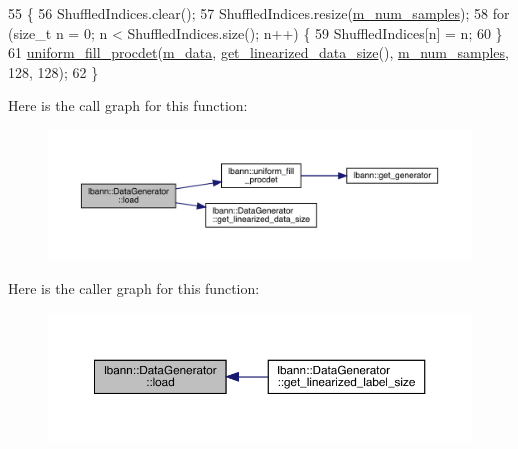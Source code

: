 \begin{DoxyCode}
55                               \{
56   ShuffledIndices.clear();
57   ShuffledIndices.resize(\hyperlink{classlbann_1_1DataGenerator_a679fdbd459ecefa053b64f78a166c020}{m\_num\_samples});
58   \textcolor{keywordflow}{for} (\textcolor{keywordtype}{size\_t} n = 0; n < ShuffledIndices.size(); n++) \{
59     ShuffledIndices[n] = n;
60   \}
61   \hyperlink{namespacelbann_a93fc1b42be6ab461e803cb48d58c4d81}{uniform\_fill\_procdet}(\hyperlink{classlbann_1_1DataGenerator_a6e14ec2aa2b20ca3dbb72eddd1c5fad8}{m\_data}, 
      \hyperlink{classlbann_1_1DataGenerator_ad24923ec94dc5b6575b50b74adbefc28}{get\_linearized\_data\_size}(), \hyperlink{classlbann_1_1DataGenerator_a679fdbd459ecefa053b64f78a166c020}{m\_num\_samples}, 128, 128);
62 \}
\end{DoxyCode}
Here is the call graph for this function\+:\nopagebreak
\begin{figure}[H]
\begin{center}
\leavevmode
\includegraphics[width=350pt]{classlbann_1_1DataGenerator_a8248cc6ea186c23147887ca83b1c4bd7_cgraph}
\end{center}
\end{figure}
Here is the caller graph for this function\+:\nopagebreak
\begin{figure}[H]
\begin{center}
\leavevmode
\includegraphics[width=350pt]{classlbann_1_1DataGenerator_a8248cc6ea186c23147887ca83b1c4bd7_icgraph}
\end{center}
\end{figure}
\mbox{\label{classlbann_1_1DataGenerator_a0feafc772df2e0923bea06d4d6065bc3}} 
